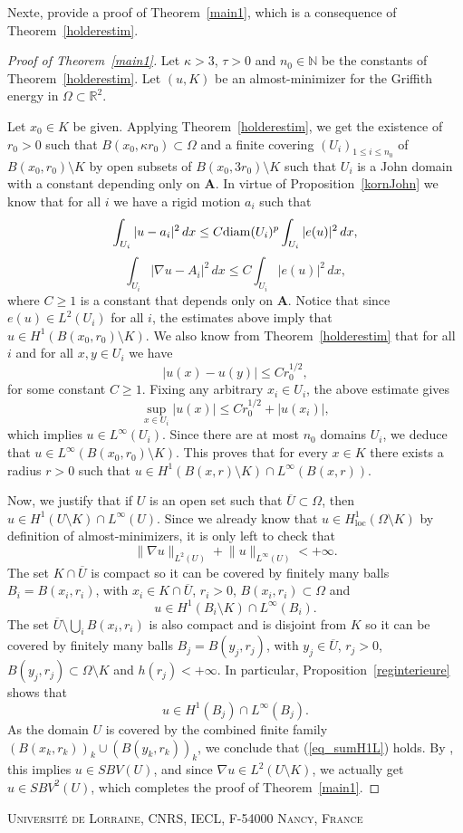 \documentclass[12pt]{article}
\theoremstyle{definition}
\theoremstyle{remark}
\numberwithin{equation}{section}
\newcommand{\R}{\mathbb{R}}
\newcommand{\N}{\mathbb{N}}
\newcommand{\A}{\mathbf{A}}
\begin{document}
Nexte, provide a proof of Theorem~\ref{main1}, which is a consequence of Theorem~\ref{holderestim}.

\begin{proof}[Proof of   Theorem~\ref{main1}]
    Let $\kappa > 3$, $\tau > 0$ and $n_0 \in \N$ be the constants of Theorem~\ref{holderestim}. Let $(u,K)$ be an almost-minimizer for the Griffith energy in $\Omega \subset \R^2$.

    Let $x_0\in K$ be given. Applying Theorem~\ref{holderestim}, we get the existence of $r_0>0$ such that $B(x_0,\kappa r_0)\subset \Omega$ and a finite covering $(U_i)_{1\leq i\leq n_0}$  of $B(x_0,r_0)\setminus K$ by open subsets of $B(x_0,3r_0)\setminus K$ such that $U_i$ is a John domain with a constant depending only on $\A$.
    In virtue of Proposition~\ref{kornJohn} we know that for all $i$ we have a rigid motion $a_i$ such that 
    \[\int_{U_i} |u-a_i|^2\,dx \leq C {\rm diam}(U_i)^p \int_{U_i} |e(u)|^2 \,dx,\]
    \[\int_{U_i} |\nabla u -A_i|^2\,dx \leq C \int_{U_i} |e(u)|^2 \,dx,\]
    where $C \geq 1$ is a constant that depends only on $\A$.  
    Notice that since $e(u)\in L^2(U_i)$ for all $i$,  the estimates above imply that $u \in H^1(B(x_0,r_0)\setminus K)$. We also know from Theorem~\ref{holderestim} that for all $i$ and for all $x,y \in U_i$ we have
    \[|u(x)-u(y)|\leq C r_0^{1/2},\]
    for some constant $C \geq 1$. Fixing any arbitrary $x_i \in U_i$, the above estimate gives 
    \[\sup_{x\in U_i}|u(x)|\leq Cr_0^{1/2}+ |u(x_i)|,\]
    which implies $u\in L^\infty(U_i)$. Since there are at most $n_0$ domains $U_i$, we deduce that $u \in L^\infty(B(x_0,r_0)\setminus K)$. 
    This proves that for every $x \in K$ there exists a radius $r > 0$ such that
    $u \in H^1(B(x,r) \setminus K) \cap L^\infty(B(x,r))$.

    Now, we justify that if $U$ is an open set such that $\overline{U}\subset \Omega$, then $u \in H^1(U \setminus K) \cap L^{\infty}(U)$. Since we already know that $u \in H^1_{\mathrm{loc}}(\Omega \setminus K)$ by definition of almost-minimizers, it is only left to check that
    \begin{equation}\label{eq_sumH1L}
        \lVert \nabla u \rVert_{L^2(U)} + \lVert u \rVert_{L^\infty(U)} < +\infty.
    \end{equation}
    The set $K \cap \overline{U}$ is compact so it can be covered by finitely many balls $B_i = B(x_i,r_i)$, with $x_i \in K \cap\overline{U}$, $r_i > 0$, $B(x_i,r_i) \subset \Omega$ and \[u \in H^1(B_i \setminus K) \cap L^{\infty}(B_i).\]
    The set $\overline{U} \setminus \bigcup_i B(x_i,r_i)$ is also compact and is disjoint from $K$ so it can be covered by finitely many balls $B_j = B(y_j,r_j)$, with $y_j \in \overline{U}$, $r_j > 0$, $B(y_j,r_j) \subset \Omega \setminus K$ and $h(r_j) < +\infty$. In particular, Proposition~\ref{reginterieure} shows that \[u \in H^1(B_j) \cap L^{\infty}(B_j).\]
    As the domain $U$ is covered by the combined finite family $(B(x_k,r_k))_k \cup (B(y_k,r_k))_k$, we conclude that (\ref{eq_sumH1L}) holds.
    By \cite[Proposition~4.4]{afp}, this implies $u \in SBV(U)$, and since $\nabla u\in L^2(U\setminus K)$, we actually get $u \in SBV^2(U)$, which completes the proof of Theorem~\ref{main1}.
\end{proof}




\medskip
\noindent
\textsc{Université de Lorraine, CNRS, IECL, F-54000 Nancy, France}
\end{document}
